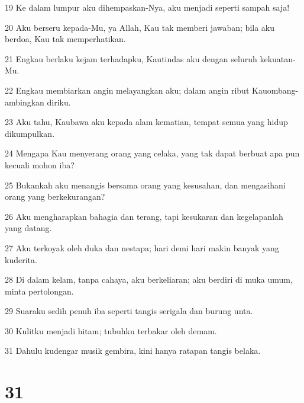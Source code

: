 \par 19 Ke dalam lumpur aku dihempaskan-Nya, aku menjadi seperti sampah saja!
\par 20 Aku berseru kepada-Mu, ya Allah, Kau tak memberi jawaban; bila aku berdoa, Kau tak memperhatikan.
\par 21 Engkau berlaku kejam terhadapku, Kautindas aku dengan seluruh kekuatan-Mu.
\par 22 Engkau membiarkan angin melayangkan aku; dalam angin ribut Kauombang-ambingkan diriku.
\par 23 Aku tahu, Kaubawa aku kepada alam kematian, tempat semua yang hidup dikumpulkan.
\par 24 Mengapa Kau menyerang orang yang celaka, yang tak dapat berbuat apa pun kecuali mohon iba?
\par 25 Bukankah aku menangis bersama orang yang kesusahan, dan mengasihani orang yang berkekurangan?
\par 26 Aku mengharapkan bahagia dan terang, tapi kesukaran dan kegelapanlah yang datang.
\par 27 Aku terkoyak oleh duka dan nestapa; hari demi hari makin banyak yang kuderita.
\par 28 Di dalam kelam, tanpa cahaya, aku berkeliaran; aku berdiri di muka umum, minta pertolongan.
\par 29 Suaraku sedih penuh iba seperti tangis serigala dan burung unta.
\par 30 Kulitku menjadi hitam; tubuhku terbakar oleh demam.
\par 31 Dahulu kudengar musik gembira, kini hanya ratapan tangis belaka.

\chapter{31}

